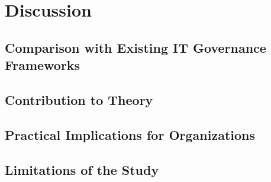 \newpage
\section{Discussion}
\label{sec:Discussion}

\subsection{Comparison with Existing IT Governance Frameworks}
\label{subsec:ComparisonWithExistingITGovernanceFrameworks}

\subsection{Contribution to Theory}
\label{subsec:ContributionToTheory}

\subsection{Practical Implications for Organizations}
\label{subsec:PracticalImplicationsForOrganizations}

\subsection{Limitations of the Study}
\label{subsec:LimitationsOfTheStudy}